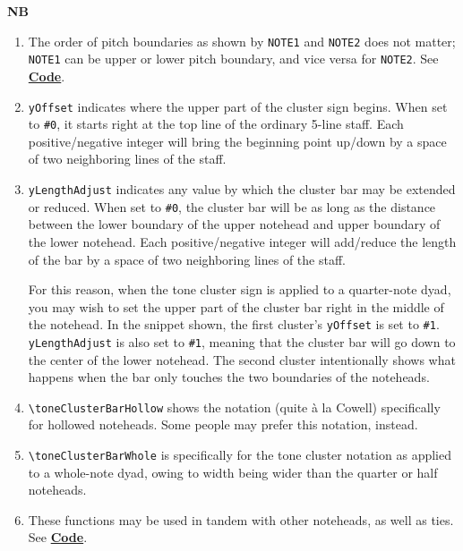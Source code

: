 \textbf{NB} \begin{enumerate}
\item The order of pitch boundaries as shown by \verb|NOTE1| and \verb|NOTE2| does not matter; \verb|NOTE1| can be upper or lower pitch boundary, and vice versa for \verb|NOTE2|. See \hyperref[sec:tone_cluster_code]{\textbf{Code}}. 
\item \verb|yOffset| indicates where the upper part of the cluster sign begins. When set to \verb|#0|, it starts right at the top line of the ordinary 5-line staff. Each positive/negative integer will bring the beginning point up/down by a space of two neighboring lines of the staff.
\item \verb|yLengthAdjust| indicates any value by which the cluster bar may be extended or reduced. When set to \verb|#0|, the cluster bar will be as long as the distance between the lower boundary of the upper notehead and upper boundary of the lower notehead. Each positive/negative integer will add/reduce the length of the bar by a space of two neighboring lines of the staff.

For this reason, when the tone cluster sign is applied to a quarter-note dyad, you may wish to set the upper part of the cluster bar right in the middle of the notehead. In the snippet shown, the first cluster's \verb|yOffset| is set to \verb|#1|.  \verb|yLengthAdjust| is also set to \verb|#1|, meaning that the cluster bar will go down to the center of the lower notehead. The second cluster intentionally shows what happens when the bar only touches the two boundaries of the noteheads.

\item \verb|\toneClusterBarHollow| shows the notation (quite à la Cowell) specifically for hollowed noteheads. Some people may prefer this notation, instead.
\item \verb|\toneClusterBarWhole| is specifically for the tone cluster notation as applied to a whole-note dyad, owing to width being wider than the quarter or half noteheads. 

\item These functions may be used in tandem with other noteheads, as well as ties. See \hyperref[sec:tone_cluster_code]{\textbf{Code}}. 

\end{enumerate}
\label{sec:tone_cluster_code}

